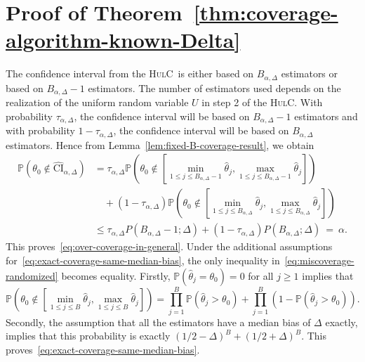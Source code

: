 \documentclass{article}
\newcommand{\hulc}{\textsc{HulC}~}
\newcommand{\hulcnospace}{\textsc{HulC}}
\numberwithin{myalgctr}{section}
\begin{document}
\section{Proof of Theorem~\ref{thm:coverage-algorithm-known-Delta}}\label{appsec:coverage-algorithm-known-Delta}
The confidence interval from the \hulc is either based on $B_{\alpha,\Delta}$ estimators or based on $B_{\alpha,\Delta} - 1$ estimators. The number of estimators used depends on the realization of the uniform random variable $U$ in step 2 of the \hulcnospace. With probability $\tau_{\alpha,\Delta}$, the confidence interval will be based on $B_{\alpha,\Delta} - 1$ estimators and with probability $1 - \tau_{\alpha,\Delta}$, the confidence interval will be based on $B_{\alpha,\Delta}$ estimators. Hence from Lemma~\ref{lem:fixed-B-coverage-result}, we obtain
\begin{equation}\label{eq:miscoverage-randomized}
\begin{split}
\mathbb{P}\left(\theta_0\notin\widehat{\mathrm{CI}}_{\alpha,\Delta}\right) &= \tau_{\alpha,\Delta}\mathbb{P}\left(\theta_0 \notin \left[\min_{1\le j\le B_{\alpha,\Delta}-1}\widehat{\theta}_j, \max_{1\le j\le B_{\alpha,\Delta}-1}\widehat{\theta}_j\right]\right)\\
&\quad+ (1-\tau_{\alpha,\Delta})\mathbb{P}\left(\theta_0\notin\left[\min_{1\le j\le B_{\alpha,\Delta}}\widehat{\theta}_j, \max_{1\le j\le B_{\alpha,\Delta}}\widehat{\theta}_j\right]\right)\\
&\le \tau_{\alpha,\Delta} P(B_{\alpha,\Delta} - 1; \Delta) + (1-\tau_{\alpha,\Delta}) P(B_{\alpha,\Delta}; \Delta) ~=~ \alpha.
\end{split}
\end{equation}
This proves~\eqref{eq:over-coverage-in-general}. 
Under the additional assumptions for~\eqref{eq:exact-coverage-same-median-bias}, the only inequality in~\eqref{eq:miscoverage-randomized} becomes equality. Firstly, $\mathbb{P}(\widehat{\theta}_j = \theta_0) = 0$ for all $j\ge1$ implies that
\[
\mathbb{P}\left(\theta_0 \notin \left[\min_{1\le j\le B}\widehat{\theta}_j, \max_{1\le j\le B}\widehat{\theta}_j\right]\right) = \prod_{j=1}^B \mathbb{P}(\widehat{\theta}_j > \theta_0) + \prod_{j=1}^B (1 - \mathbb{P}(\widehat{\theta}_j > \theta_0)).
\]
Secondly, the assumption that all the estimators have a median bias of $\Delta$ exactly, implies that this probability is exactly $(1/2 - \Delta)^B + (1/2 + \Delta)^B$. This proves~\eqref{eq:exact-coverage-same-median-bias}.
\end{document}
